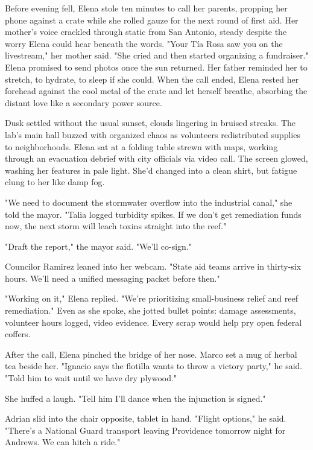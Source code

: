 Before evening fell, Elena stole ten minutes to call her parents, propping her phone against a crate while she rolled gauze for the next round of first aid. Her mother's voice crackled through static from San Antonio, steady despite the worry Elena could hear beneath the words. "Your Tía Rosa saw you on the livestream," her mother said. "She cried and then started organizing a fundraiser." Elena promised to send photos once the sun returned. Her father reminded her to stretch, to hydrate, to sleep if she could. When the call ended, Elena rested her forehead against the cool metal of the crate and let herself breathe, absorbing the distant love like a secondary power source.

Dusk settled without the usual sunset, clouds lingering in bruised streaks. The lab's main hall buzzed with organized chaos as volunteers redistributed supplies to neighborhoods. Elena sat at a folding table strewn with maps, working through an evacuation debrief with city officials via video call. The screen glowed, washing her features in pale light. She'd changed into a clean shirt, but fatigue clung to her like damp fog.

"We need to document the stormwater overflow into the industrial canal," she told the mayor. "Talia logged turbidity spikes. If we don't get remediation funds now, the next storm will leach toxins straight into the reef."

"Draft the report," the mayor said. "We'll co-sign."

Councilor Ramirez leaned into her webcam. "State aid teams arrive in thirty-six hours. We'll need a unified messaging packet before then."

"Working on it," Elena replied. "We're prioritizing small-business relief and reef remediation." Even as she spoke, she jotted bullet points: damage assessments, volunteer hours logged, video evidence. Every scrap would help pry open federal coffers.

After the call, Elena pinched the bridge of her nose. Marco set a mug of herbal tea beside her. "Ignacio says the flotilla wants to throw a victory party," he said. "Told him to wait until we have dry plywood."

She huffed a laugh. "Tell him I'll dance when the injunction is signed."

Adrian slid into the chair opposite, tablet in hand. "Flight options," he said. "There's a National Guard transport leaving Providence tomorrow night for Andrews. We can hitch a ride."

